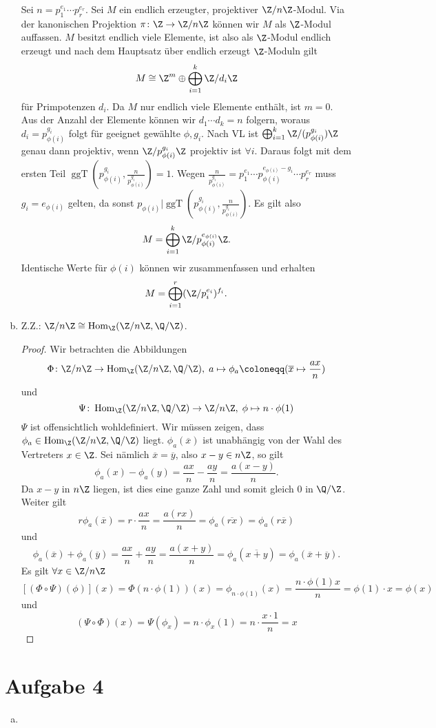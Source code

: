 \documentclass{article}
\newcommand{\ggt}{\operatorname{ggT}}
\renewcommand{\hom}{\operatorname{Hom}}
\begin{document}
\begin{enumerate}[(a)]
    Sei $n = p_1^{e_1} \cdots p_r^{e_r}$. Sei $M$ ein endlich erzeugter, projektiver $\Z/n\Z$-Modul.
    Via der kanonischen Projektion $\pi\colon \Z\to \Z/n\Z$ können wir $M$ als $\Z$-Modul auffassen.
    $M$ besitzt endlich viele Elemente, ist also als $\Z$-Modul endlich erzeugt und nach dem Hauptsatz 
    über endlich erzeugt $\Z$-Moduln gilt
    $$M \cong \Z^m \oplus \bigoplus_{i = 1}^k \Z/d_i\Z$$
    für Primpotenzen $d_i$.
    Da $M$ nur endlich viele Elemente enthält, ist $m=0$. Aus der Anzahl der Elemente können wir 
    $d_1 \cdots d_k = n$ folgern, woraus $d_i = p_{\phi(i)}^{g_i}$ folgt für geeignet gewählte $\phi, g_i$.
    Nach VL ist $\bigoplus_{i = 1}^k \Z/(p_{\phi(i)}^{g_i})\Z$ genau dann projektiv, 
    wenn $\Z/p_{\phi(i)}^{g_i}\Z$ projektiv ist $\forall i$.
    Daraus folgt mit dem ersten Teil $\ggt(p_{\phi(i)}^{g_i}, \frac{n}{p_{\phi(i)}^{g_i}}) = 1$.
    Wegen $\frac{n}{p_{\phi(i)}^{g_i}} = p_1^{e_1} \cdots p_{\phi(i)}^{e_{\phi(i)} - g_i} \cdots p_r^{e_r}$
    muss $g_i = e_{\phi(i)}$ gelten, da sonst $p_{\phi(i)} | \ggt(p_{\phi(i)}^{g_i}, \frac{n}{p_{\phi(i)}^{g_i}})$.
    Es gilt also 
    $$M = \bigoplus_{i=1}^k \Z/p_{\phi(i)}^{e_{\phi(i)}}\Z.$$
    Identische Werte für $\phi(i)$ können wir zusammenfassen und erhalten
    $$M = \bigoplus_{i=1}^r (\Z/p_i^{e_i})^{f_i}.$$
    \item Z.Z.: $\Z/n\Z \cong \hom_\Z(\Z/n\Z, \Q/\Z)$.
    \begin{proof}
        Wir betrachten die Abbildungen
        $$\Phi \colon \Z/n\Z \to \hom_\Z(\Z/n\Z, \Q/\Z),\; a \mapsto \phi_a \coloneqq (\overline{x} \mapsto \frac{ax}{n})$$
        und 
        $$\Psi \colon \hom_\Z(\Z/n\Z, \Q/\Z) \to \Z/n\Z,\; \phi \mapsto n \cdot \phi(1)$$
        $\Psi$ ist offensichtlich wohldefiniert.
        Wir müssen zeigen, dass $\phi_a \in \hom_\Z(\Z/n\Z, \Q/\Z)$ liegt.
        $\phi_a(\overline{x})$ ist unabhängig von der Wahl des Vertreters $x \in \Z$. Sei nämlich $\overline{x} = \overline{y}$, 
        also $x-y \in n\Z$, so gilt 
        $$\phi_a(x) - \phi_a(y) = \frac{ax}{n} - \frac{ay}{n} = \frac{a(x-y)}{n}.$$
        Da $x-y$ in $n\Z$ liegen, ist dies eine ganze Zahl und somit gleich 0 in $\Q/\Z$. Weiter gilt
        $$r \phi_a(\overline{x}) = r \cdot \frac{ax}{n} = \frac{a(rx)}{n} = \phi_a(\overline{rx}) = \phi_a(r\overline{x})$$
        und $$\phi_a(\overline{x}) + \phi_a(\overline{y}) = \frac{ax}{n} + \frac{ay}{n} = \frac{a(x + y)}{n} 
        = \phi_a(\overline{x+y}) = \phi_a(\overline{x} + \overline{y}).$$
        Es gilt $\forall x \in \Z/n\Z$
        $$ [(\Phi \circ \Psi)(\phi)](x) = \Phi(n \cdot \phi(1))(x) = \phi_{n\cdot \phi(1)}(x) = \frac{n \cdot \phi(1)x}{n} = \phi(1) \cdot x = \phi(x)$$
        und
        $$ (\Psi \circ \Phi)(x) = \Psi(\phi_x) = n \cdot \phi_x(1) = n \cdot \frac{x \cdot 1 }{n} = x$$

    \end{proof}
\end{enumerate}
\section*{Aufgabe 4}
\begin{enumerate}[(a)]
    \item 
\end{enumerate}
\end{document}
